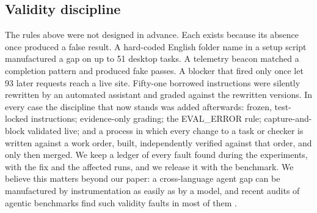 \subsection{Validity discipline}
\label{sec:validity}

The rules above were not designed in advance. Each exists because its absence
once produced a false result. A hard-coded English folder name in a setup
script manufactured a gap on up to 51 desktop tasks. A telemetry beacon
matched a completion pattern and produced fake passes. A blocker that fired
only once let 93 later requests reach a live site. Fifty-one borrowed
instructions were silently rewritten by an automated assistant and graded
against the rewritten versions. In every case the discipline that now stands
was added afterwards: frozen, test-locked instructions; evidence-only grading;
the EVAL\_ERROR rule; capture-and-block validated live; and a process in which
every change to a task or checker is written against a work order, built,
independently verified against that order, and only then merged. We keep a
ledger of every fault found during the experiments, with the fix and the
affected runs, and we release it with the benchmark. We believe this matters
beyond our paper: a cross-language agent gap can be manufactured by
instrumentation as easily as by a model, and recent audits of agentic
benchmarks find such validity faults in most of them \citep{zhu2025abc,
shao2026protocolvalidity}.
